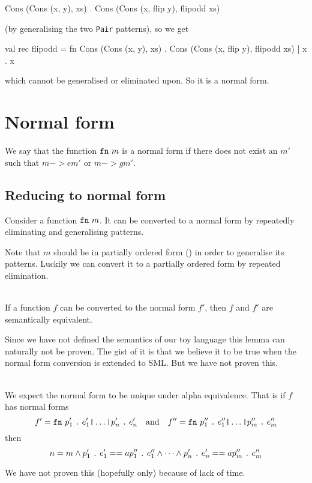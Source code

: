 \begin{example}[Generalisation, $->g$]
\begin{sml}
Cons (Cons (x, y), xs) . Cons (Cons (x, flip y), flipodd xs)
\end{sml}
\noindent (by generalising the two \texttt{Pair} patterns), so we get

\begin{sml}
val rec flipodd =
fn Cons (Cons (x, y), xs) .
     Cons (Cons (x, flip y), flipodd xs)
 | x . x
\end{sml}
which cannot be generalised or eliminated upon. So it is a normal form.

\end{example}

\section{Normal form}
We say that the function $\texttt{fn}\  m$ is a normal form if there does not exist an
$m'$ such that $m ->e m'$ or $m ->g m'$.

\subsection{Reducing to normal form}
Consider a function $\texttt{fn}\  m$. It can be converted to a normal form by repeatedly
eliminating and generalising patterns.

Note that $m$ should be in partially ordered form () in
order to generalise its patterns. Luckily we can convert it to a partially
ordered form by repeated elimination.

\begin{lemma}\ \\
  If a function $f$ can be converted to the normal form $f'$, then $f$ and $f'$
  are semantically equivalent.

  Since we have not defined the semantics of our toy language this lemma can
  naturally not be proven. The gist of it is that we believe it to be true when
  the normal form conversion is extended to SML. But we have not proven this.
\end{lemma}

\begin{lemma}\ \\
  We expect the normal form to be unique under alpha equivalence. That is if
  $f$  has normal forms
  \[
  f' = \texttt{fn}\  p'_1\mathrel{\texttt{.}}e'_1 \texttt{|} \ldots \texttt{|} p'_n\mathrel{\texttt{.}}e'_n
  \quad \textrm{and} \quad
  f'' = \texttt{fn}\  p''_1\mathrel{\texttt{.}}e''_1 \texttt{|} \ldots \texttt{|} p''_m\mathrel{\texttt{.}}e''_m
  \]
  then
  \[
  n = m \land p'_1\mathrel{\texttt{.}}e'_1 ==a p''_1\mathrel{\texttt{.}}e''_1 \land \cdots \land
  p'_n\mathrel{\texttt{.}}e'_n ==a p''_m\mathrel{\texttt{.}}e''_m
  \]

  We have not proven this (hopefully only) because of lack of time.
\end{lemma}

